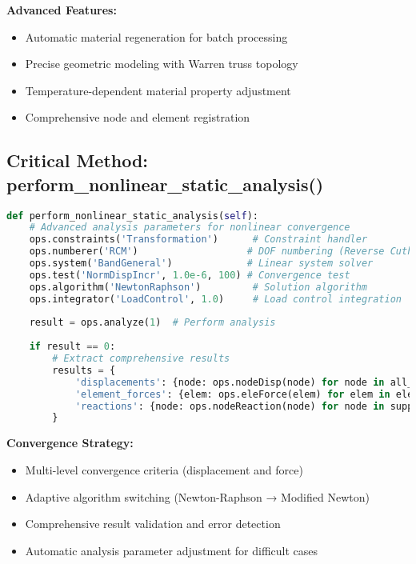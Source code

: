 \documentclass[12pt,a4paper]{article}
\begin{document}
\textbf{Advanced Features:}
\begin{itemize}
    \item Automatic material regeneration for batch processing
    \item Precise geometric modeling with Warren truss topology
    \item Temperature-dependent material property adjustment
    \item Comprehensive node and element registration
\end{itemize}

\subsection{Critical Method: perform\_nonlinear\_static\_analysis()}

\begin{lstlisting}[language=Python, caption=Nonlinear Static Analysis]
def perform_nonlinear_static_analysis(self):
    # Advanced analysis parameters for nonlinear convergence
    ops.constraints('Transformation')      # Constraint handler
    ops.numberer('RCM')                   # DOF numbering (Reverse Cuthill-McKee)
    ops.system('BandGeneral')             # Linear system solver
    ops.test('NormDispIncr', 1.0e-6, 100) # Convergence test
    ops.algorithm('NewtonRaphson')         # Solution algorithm
    ops.integrator('LoadControl', 1.0)     # Load control integration
    
    result = ops.analyze(1)  # Perform analysis
    
    if result == 0:
        # Extract comprehensive results
        results = {
            'displacements': {node: ops.nodeDisp(node) for node in all_nodes},
            'element_forces': {elem: ops.eleForce(elem) for elem in elements},
            'reactions': {node: ops.nodeReaction(node) for node in supports}
        }
\end{lstlisting}

\textbf{Convergence Strategy:}
\begin{itemize}
    \item Multi-level convergence criteria (displacement and force)
    \item Adaptive algorithm switching (Newton-Raphson → Modified Newton)
    \item Comprehensive result validation and error detection
    \item Automatic analysis parameter adjustment for difficult cases
\end{itemize}
\end{document}
